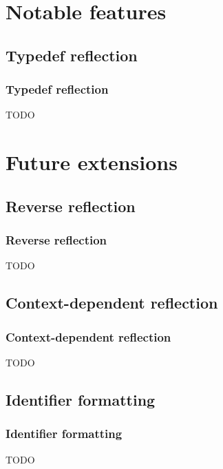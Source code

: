 \documentclass[compress,table,xcolor=table]{beamer}
\begin{document}
\section{Notable features}

\subsection{Typedef reflection}
\begin{frame}
\frametitle{Typedef reflection}
\Huge TODO
\end{frame}

\section{Future extensions}

\subsection{Reverse reflection}
\begin{frame}
\frametitle{Reverse reflection}
\Huge TODO
\end{frame}

\subsection{Context-dependent reflection}
\begin{frame}
\frametitle{Context-dependent reflection}
\Huge TODO
\end{frame}

\subsection{Identifier formatting}
\begin{frame}
\frametitle{Identifier formatting}
\Huge TODO
\end{frame}
\end{document}
